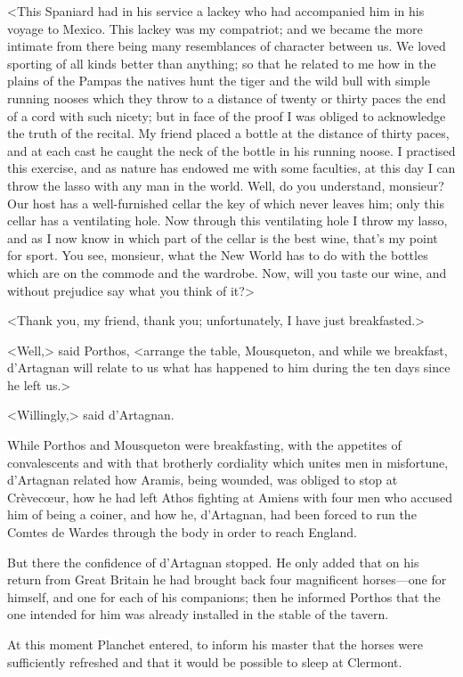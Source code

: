 <This Spaniard had in his service a lackey who had accompanied him in his voyage to Mexico. This lackey was my compatriot; and we became the more intimate from there being many resemblances of character between us. We loved sporting of all kinds better than anything; so that he related to me how in the plains of the Pampas the natives hunt the tiger and the wild bull with simple running nooses which they throw to a distance of twenty or thirty paces the end of a cord with such nicety; but in face of the proof I was obliged to acknowledge the truth of the recital. My friend placed a bottle at the distance of thirty paces, and at each cast he caught the neck of the bottle in his running noose. I practised this exercise, and as nature has endowed me with some faculties, at this day I can throw the lasso with any man in the world. Well, do you understand, monsieur? Our host has a well-furnished cellar the key of which never leaves him; only this cellar has a ventilating hole. Now through this ventilating hole I throw my lasso, and as I now know in which part of the cellar is the best wine, that's my point for sport. You see, monsieur, what the New World has to do with the bottles which are on the commode and the wardrobe. Now, will you taste our wine, and without prejudice say what you think of it?> 

<Thank you, my friend, thank you; unfortunately, I have just breakfasted.> 

<Well,> said Porthos, <arrange the table, Mousqueton, and while we breakfast, d'Artagnan will relate to us what has happened to him during the ten days since he left us.> 

<Willingly,> said d'Artagnan. 

While Porthos and Mousqueton were breakfasting, with the appetites of convalescents and with that brotherly cordiality which unites men in misfortune, d'Artagnan related how Aramis, being wounded, was obliged to stop at Crèvecœur, how he had left Athos fighting at Amiens with four men who accused him of being a coiner, and how he, d'Artagnan, had been forced to run the Comtes de Wardes through the body in order to reach England. 

But there the confidence of d'Artagnan stopped. He only added that on his return from Great Britain he had brought back four magnificent horses---one for himself, and one for each of his companions; then he informed Porthos that the one intended for him was already installed in the stable of the tavern. 

At this moment Planchet entered, to inform his master that the horses were sufficiently refreshed and that it would be possible to sleep at Clermont. 

